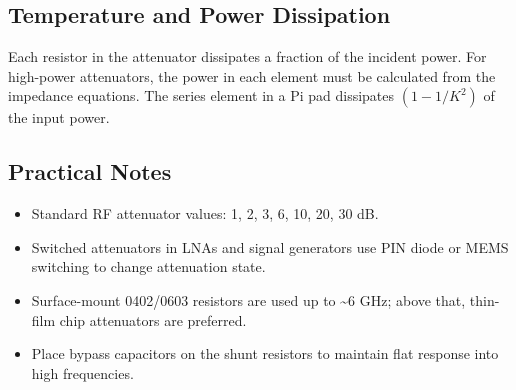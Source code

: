       

\subsection{Temperature and Power Dissipation}

      

Each resistor in the attenuator dissipates a fraction of the incident power. For high-power attenuators, the power in each element must be calculated from the impedance equations. The series element in a Pi pad dissipates $(1 - 1/K^2)$ of the input power.


      

\subsection{Practical Notes}

      
\begin{itemize}

        \item Standard RF attenuator values: 1, 2, 3, 6, 10, 20, 30 dB.

        \item Switched attenuators in LNAs and signal generators use PIN diode or MEMS switching to change attenuation state.

        \item Surface-mount 0402/0603 resistors are used up to \textasciitilde{}6 GHz; above that, thin-film chip attenuators are preferred.

        \item Place bypass capacitors on the shunt resistors to maintain flat response into high frequencies.

      
\end{itemize}



